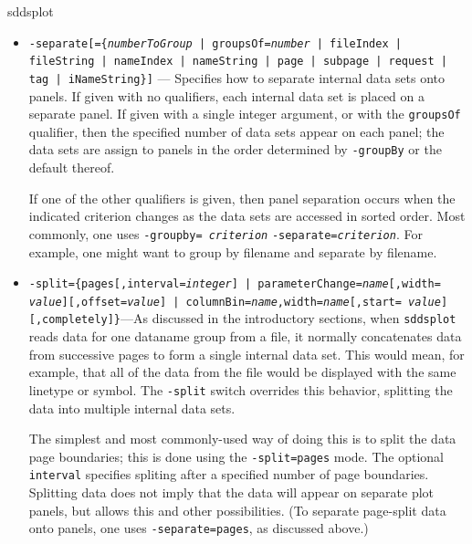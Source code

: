 \begin{sddsprog}{sddsplot}
\begin{itemize}
\begin{itemize}
The order in which the qualifiers to {\tt -groupBy} are given determines the priority of sorting by
the various criteria.  In the default ordering, data sets are sorted by request number, subsorted by
tag (usually a null operation unless data is tagged by the user), subsubsorted by file index,
subsubsubsorted by dataname index, etc.  Each successive qualifier results in moving the indicated
sort criterion to the next highest priority.  Any qualifiers not given are retained in the default
order.

If one wanted to bring together, for example, internal data sets with the same data name, one would
give {\tt -groupby=nameString}.  In this case, the new sorting priority would be {\tt nameString},
{\tt request}, {\tt tag}, etc.

  \item {\tt -separate[=\{{\em numberToGroup} | groupsOf={\em number} | fileIndex | fileString |
nameIndex | nameString | page | subpage | request | tag | iNameString\}]} --- Specifies how to separate internal data
sets onto panels.  If given with no qualifiers, each internal data set is placed on a separate panel.
If given with a single integer argument, or with the {\tt groupsOf} qualifier, then the specified
number of data sets appear on each panel; the data sets are assign to panels in the order determined
by {\tt -groupBy} or the default thereof.

If one of the other qualifiers is given, then panel separation occurs when the indicated criterion
changes as the data sets are accessed in sorted order.  Most commonly, one uses {\tt -groupby={\em
criterion}} {\tt -separate={\em criterion}}.  For example, one might want to group by filename and
separate by filename.
 
  \item {\tt -split=\{pages[,interval={\em integer}] | parameterChange={\em name}[,width={\em
value}][,offset={\em value}] | columnBin={\em name},width={\em name}[,start={\em
value}][,completely]\}}---As discussed in the introductory sections, when \verb|sddsplot| reads data
for one dataname group from a file, it normally concatenates data from successive pages to form a
single internal data set.  This would mean, for example, that all of the data from the file would be
displayed with the same linetype or symbol.  The {\tt -split} switch overrides this behavior,
splitting the data into multiple internal data sets.

The simplest and most commonly-used way of doing this is to split the data page boundaries; this is
done using the {\tt -split=pages} mode.  The optional {\tt interval} specifies spliting after a
specified number of page boundaries.  Splitting data does not imply that the data will appear on
separate plot panels, but allows this and other possibilities.  (To separate page-split data onto
panels, one uses {\tt -separate=pages}, as discussed above.)


\end{itemize}
\end{itemize}
\end{sddsprog}
